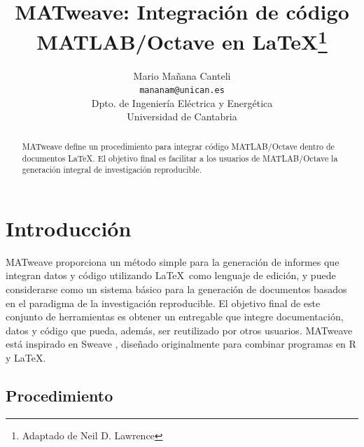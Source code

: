 \documentclass{article}
\title{MATweave: Integración de código MATLAB/Octave en \LaTeX \footnote{Adaptado de  Neil D. Lawrence}}
\author{Mario Mañana Canteli \\\texttt{mananam@unican.es}\\Dpto. de Ingeniería Eléctrica y Energética\\Universidad de Cantabria}
\date{} %
\begin{document}
\maketitle


\begin{abstract}
MATweave define un procedimiento para integrar código MATLAB/Octave dentro de documentos \LaTeX. El objetivo final es facilitar a los usuarios de MATLAB/Octave la generación integral de investigación reproducible.
\end{abstract}

\section{Introducción}

MATweave proporciona un método simple para la generación de informes que integran datos y código utilizando \LaTeX\ como lenguaje de edición, y puede considerarse como un sistema básico para la generación de documentos basados en el paradigma de la investigación reproducible. El objetivo final de este conjunto de herramientas es obtener un entregable que integre documentación, datos y código que pueda, además, ser reutilizado por otros usuarios.
MATweave está inspirado en Sweave \cite{lmucs-papers:Leisch:2002}, diseñado originalmente para combinar programas en R y \LaTeX. 

\subsection{Procedimiento}
\end{document}
